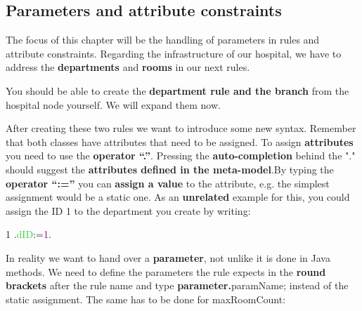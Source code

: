 \clearpage

\subsection{Parameters and attribute constraints}

The focus of this chapter will be the handling of parameters in rules and attribute constraints.
Regarding the infrastructure of our hospital, we have to address the \textbf{departments} and \textbf{rooms} in our next rules.\newline

You should be able to create the \textbf{department rule and the branch} from the hospital node yourself. We will expand them now.\newline

After creating these two rules we want to introduce some new syntax. Remember that both classes have attributes that need to be assigned. To assign \textbf{attributes} you need to use the \textbf{operator “.”}. Pressing the \textbf{auto-completion} behind the "." should suggest the \textbf{attributes defined in the meta-model}.\newline By typing the \textbf{operator “:=”} you can \textbf{assign a value} to the attribute, e.g. the simplest assignment would be a static one.\newline
As an \textbf{unrelated} example for this, you could assign the \textsf{ID 1} to the department you create by writing: \newline

1 \hspace{0.5cm} .\textcolor{LimeGreen}{dID}:=\textcolor{Purple}{1}. \newline

In reality we want to hand over a \textbf{parameter}, not unlike it is done in Java methods.\newline
We need to define the parameters the rule expects in the \textbf{round brackets} after the rule name and type \textbf{parameter.}\textsf{paramName}; instead of the static assignment. The same has to be done for \textsf{maxRoomCount}:\newline\newline

